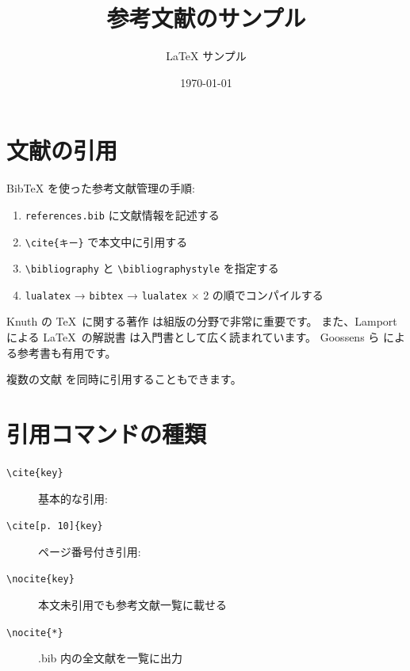 \documentclass[lualatex,ja=standard]{bxjsarticle}
\title{参考文献のサンプル}
\author{LaTeX サンプル}
\date{\today}
\begin{document}
\maketitle

\section{文献の引用}

BibTeX を使った参考文献管理の手順:

\begin{enumerate}
  \item \texttt{references.bib} に文献情報を記述する
  \item \texttt{\textbackslash cite\{キー\}} で本文中に引用する
  \item \texttt{\textbackslash bibliography} と \texttt{\textbackslash bibliographystyle} を指定する
  \item \texttt{lualatex} → \texttt{bibtex} → \texttt{lualatex} × 2 の順でコンパイルする
\end{enumerate}

Knuth の \TeX\ に関する著作\cite{knuth1984} は組版の分野で非常に重要です。
また、Lamport による \LaTeX\ の解説書\cite{lamport1994} は入門書として広く読まれています。
Goossens ら\cite{goossens1993} による参考書も有用です。

複数の文献\cite{knuth1984, lamport1994} を同時に引用することもできます。

\section{引用コマンドの種類}

\begin{description}
  \item[\texttt{\textbackslash cite\{key\}}] 基本的な引用: \cite{knuth1984}
  \item[\texttt{\textbackslash cite[p.~10]\{key\}}] ページ番号付き引用: \cite[p.~10]{lamport1994}
  \item[\texttt{\textbackslash nocite\{key\}}] 本文未引用でも参考文献一覧に載せる
  \item[\texttt{\textbackslash nocite\{*\}}] .bib 内の全文献を一覧に出力
\end{description}
\end{document}
